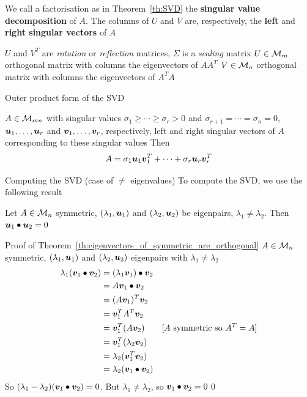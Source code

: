 \documentclass[aspectratio=169]{beamer}\usepackage[]{graphicx}\usepackage[]{xcolor}
\begin{document}
\begin{frame}
\begin{definition}
We call a factorisation as in Theorem~\ref{th:SVD} the \textbf{singular value decomposition} of $A$. The columns of $U$ and $V$ are, respectively, the \textbf{left} and \textbf{right singular vectors} of $A$
\end{definition}
\vfill
$U$ and $V^T$ are \emph{rotation} or \emph{reflection} matrices, $\Sigma$ is a \emph{scaling} matrix
\vfill
$U\in\mathcal{M}_m$ orthogonal matrix with columns the eigenvectors of $AA^T$
\vfill
$V\in\mathcal{M}_n$ orthogonal matrix with columns the eigenvectors of $A^TA$
\end{frame}


\begin{frame}{Outer product form of the SVD}
\begin{theorem}\label{th:SVD_outer_product_form}
$A\in\mathcal{M}_{mn}$ with singular values $\sigma_1\geq\cdots\geq\sigma_r>0$ and $\sigma_{r+1}=\cdots=\sigma_n=0$, $\bm{u}_1,\ldots,\bm{u}_r$ and $\bm{v}_1,\ldots,\bm{v}_r$, respectively, left and right singular vectors of $A$ corresponding to these singular values
\vskip0.5cm
Then 
\begin{equation}\label{eq:outer-product-form-SVD}
A=\sigma_1\bm{u}_1\bm{v}_1^T+\cdots+\sigma_r\bm{u}_r\bm{v}_r^T
\end{equation}
\end{theorem}
\end{frame}


\begin{frame}{Computing the SVD (case of $\neq$ eigenvalues)}
To compute the SVD, we use the following result
\vfill
\begin{theorem}\label{th:eigenvectors_of_symmetric_are_orthogonal}
Let $A\in\mathcal{M}_n$ symmetric, $(\lambda_1,\bm{u}_1)$ and $(\lambda_2,\bm{u}_2)$ be eigenpairs, $\lambda_1\neq\lambda_2$. Then $\bm{u}_1\bullet\bm{u}_2=0$
\end{theorem}
\end{frame}

\begin{frame}{Proof of Theorem~\ref{th:eigenvectors_of_symmetric_are_orthogonal}}
$A\in\mathcal{M}_n$ symmetric, $(\lambda_1,\bm{u}_1)$ and $(\lambda_2,\bm{u}_2)$ eigenpairs with $\lambda_1\neq\lambda_2$
\begin{align*}
\lambda_1(\bm{v}_1\bullet\bm{v}_2) 
&= (\lambda_1\bm{v}_1)\bullet\bm{v}_2 \\
&= A\bm{v}_1\bullet\bm{v}_2 \\
&= (A\bm{v}_1)^T\bm{v}_2 \\
&= \bm{v}_1^TA^T\bm{v}_2 \\
&= \bm{v}_1^T(A\bm{v}_2)  \qquad\textrm{[$A$ symmetric so $A^T=A$]} \\
&= \bm{v}_1^T(\lambda_2\bm{v}_2) \\
&= \lambda_2(\bm{v}_1^T\bm{v}_2) \\
&= \lambda_2(\bm{v}_1\bullet\bm{v}_2)
\end{align*}
\vfill
So $(\lambda_1-\lambda_2)(\bm{v}_1\bullet\bm{v}_2)=0$. But $\lambda_1\neq\lambda_2$, so $\bm{v}_1\bullet\bm{v}_2=0$\hfill\qed
\end{frame}
\end{document}
